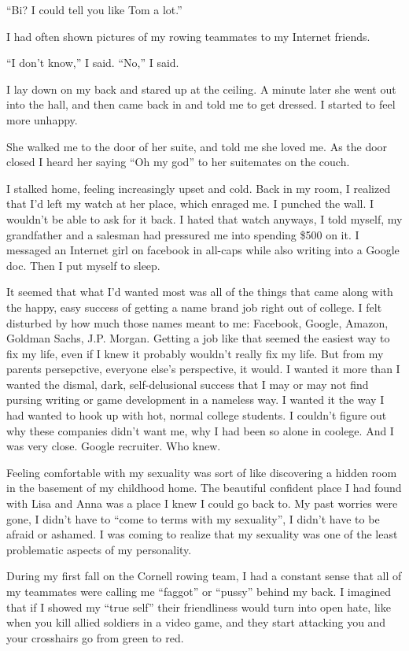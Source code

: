 ``Bi?  I could tell you like Tom a lot.''

I had often shown pictures of my rowing teammates to my Internet friends.

``I don't know,'' I said.  ``No,'' I said.

I lay down on my back and stared up at the ceiling.  A minute later she went out
into the hall, and then came back in and told me to get dressed.  I started to
feel more unhappy.

She walked me to the door of her suite, and told me she loved me.  As the door
closed I heard her saying ``Oh my god'' to her suitemates on the couch.

I stalked home, feeling increasingly upset and cold.  Back in my room, I
realized that I'd left my watch at her place, which enraged me.  I punched the
wall.  I wouldn't be able to ask for it back.  I hated that watch anyways, I
told myself, my grandfather and a salesman had pressured me into spending \$500
on it.  I messaged an Internet girl on facebook in all-caps while also writing
into a Google doc.  Then I put myself to sleep.

It seemed that what I'd wanted most was all of the things that came along with
the happy, easy success of getting a name brand job right out of college.  I
felt disturbed by how much those names meant to me: Facebook, Google, Amazon,
Goldman Sachs, J.P. Morgan.  Getting a job like that seemed the easiest way to
fix my life, even if I knew it probably wouldn't really fix my life.  But from
my parents persepctive, everyone else's perspective, it would.  I wanted it more
than I wanted the dismal, dark, self-delusional success that I may or may not
find pursing writing or game development in a nameless way.  I wanted it the way
I had wanted to hook up with hot, normal college students.  I couldn't figure
out why these companies didn't want me, why I had been so alone in coolege.  And
I was very close.  Google recruiter.  Who knew.

Feeling comfortable with my sexuality was sort of like discovering a hidden room
in the basement of my childhood home.  The beautiful confident place I had found
with Lisa and Anna was a place I knew I could go back to.  My past worries were
gone, I didn't have to ``come to terms with my sexuality'', I didn't have to be
afraid or ashamed.  I was coming to realize that my sexuality was one of the
least problematic aspects of my personality.
 
During my first fall on the Cornell rowing team, I had a constant sense that all
of my teammates were calling me ``faggot'' or ``pussy'' behind my back.  I
imagined that if I showed my ``true self'' their friendliness would turn into
open hate, like when you kill allied soldiers in a video game, and they start
attacking you and your crosshairs go from green to red.  

